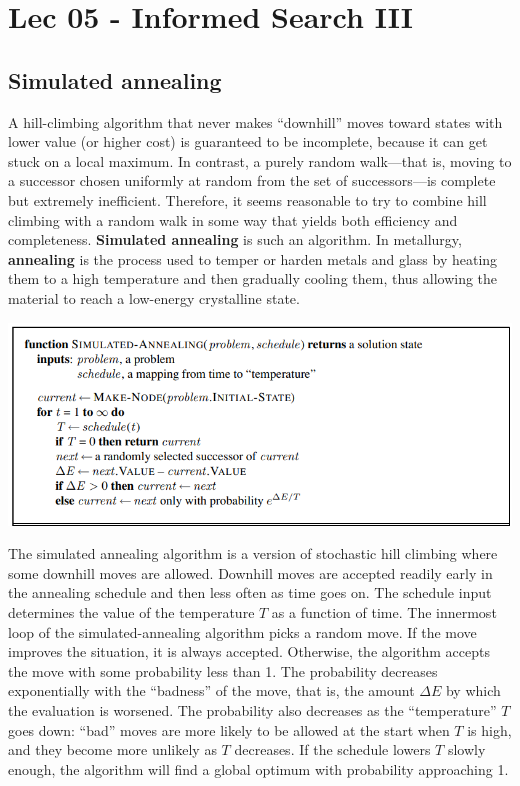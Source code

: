 \chapter{Lec 05 - Informed Search III}
\section{ Simulated annealing}
A hill-climbing algorithm that never makes “downhill” moves toward states with lower value (or higher cost) is guaranteed to be incomplete, because it can get stuck on a local maximum. In contrast, a purely random walk—that is, moving to a successor chosen uniformly at random from the set of successors—is complete but extremely inefficient. Therefore, it seems reasonable to try to combine hill climbing with a random walk in some way that yields both efficiency and completeness. \textbf{Simulated annealing} is such an algorithm. In metallurgy, \textbf{annealing} is the process used to temper or harden metals and glass by heating them to a high temperature and then gradually cooling them, thus allowing the material to reach a low-energy crystalline state.
\begin{center}
    \includegraphics[]{images/annealing.png}
\end{center}
The simulated annealing algorithm is a version of stochastic hill climbing where some downhill moves are allowed. Downhill moves are accepted readily early in the annealing schedule and then less often as time goes on. The schedule input determines the value of the temperature $T$ as a function of time.\newline\newline
The innermost loop of the simulated-annealing algorithm picks a random move. If the move improves the situation, it is always accepted. Otherwise, the algorithm accepts the move with some probability less than 1. The probability decreases exponentially with the “badness” of the move, that is, the amount $\Delta E$ by which the evaluation is worsened. The probability also decreases as the “temperature” $T$ goes down: “bad” moves are more likely to be allowed at the start when $T$ is high, and they become more unlikely as $T$ decreases. If the schedule lowers $T$ slowly enough, the algorithm will find a global optimum with probability approaching 1.

